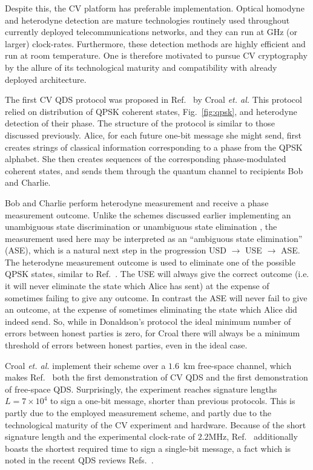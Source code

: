 Despite this, the CV platform has preferable implementation. Optical homodyne and heterodyne detection are mature technologies routinely used throughout currently deployed telecommunications networks, and they can run at GHz (or larger) clock-rates. Furthermore, these detection methods are highly efficient and run at room temperature. One is therefore motivated to pursue CV cryptography by the allure of its technological maturity and compatibility with already deployed architecture. %

The first CV QDS protocol was proposed in Ref.~\cite{Croal2016} by Croal \emph{et. al.} This protocol relied on distribution of QPSK coherent states, Fig.~\ref{fig:qpsk}, and heterodyne detection of their phase. The structure of the protocol is similar to those discussed previously. Alice, for each future one-bit message she might send, first creates strings of classical information corresponding to a phase from the QPSK alphabet. She then creates sequences of the corresponding phase-modulated coherent states, and sends them through the quantum channel to recipients Bob and Charlie.

Bob and Charlie perform heterodyne measurement and receive a phase measurement outcome. Unlike the schemes discussed earlier implementing an unambiguous state discrimination \cite{Dunjko2014} or unambiguous state elimination \cite{Donaldson2016}, the measurement used here may be interpreted as an ``ambiguous state elimination'' (ASE), which is a natural next step in the progression USD $\rightarrow$ USE $\rightarrow$ ASE. The heterodyne measurement outcome is used to eliminate one of the possible QPSK states, similar to Ref.~\cite{Donaldson2016}. The USE will always give the correct outcome (i.e. it will never eliminate the state which Alice has sent) at the expense of sometimes failing to give any outcome. In contrast the ASE will never fail to give an outcome, at the expense of sometimes eliminating the state which Alice did indeed send. So, while in Donaldson's protocol \cite{Donaldson2016} the ideal minimum number of errors between honest parties is zero, for Croal \cite{Croal2016} there will always be a minimum threshold of errors between honest parties, even in the ideal case.

Croal \emph{et. al.} implement their scheme over a $1.6$~km free-space channel, which makes Ref.~\cite{Croal2016} both the first demonstration of CV QDS and the first demonstration of free-space QDS. Surprisingly, the experiment reaches signature lengths $L = 7 \times 10^4$ to sign a one-bit message, shorter than previous protocols. This is partly due to the employed measurement scheme, and partly due to the technological maturity of the CV experiment and hardware. Because of the short signature length and the experimental clock-rate of $2.2$MHz, Ref.~\cite{Croal2016} additionally boasts the shortest required time to sign a single-bit message, a fact which is noted in the recent QDS reviews Refs.~\cite{Collins2016, Collins2018}.


